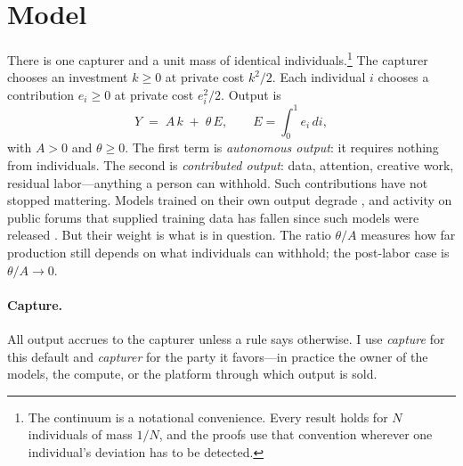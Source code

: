 \section{Model}

There is one capturer and a unit mass of identical individuals.\footnote{The continuum is
a notational convenience. Every result holds for $N$ individuals of mass $1/N$, and the
proofs use that convention wherever one individual's deviation has to be detected.} The
capturer chooses an investment $k\ge 0$ at private cost $k^2/2$. Each individual $i$ chooses
a contribution $e_i\ge 0$ at private cost $e_i^2/2$. Output is
\begin{equation}
  Y \;=\; A\,k \;+\; \theta\,E, \qquad E=\int_0^1 e_i\,di ,
\end{equation}
with $A>0$ and $\theta\ge 0$. The first term is \emph{autonomous output}: it requires
nothing from individuals. The second is \emph{contributed output}: data, attention,
creative work, residual labor---anything a person can withhold. Such contributions have
not stopped mattering. Models trained on their own output degrade \citep{Shumailov2024},
and activity on public forums that supplied training data has fallen since such models
were released \citep{delRioChanona2024}. But their weight is what is in question. The ratio $\theta/A$
measures how far production still depends on what individuals can withhold; the
post-labor case is $\theta/A\to 0$.

\paragraph{Capture.} All output accrues to the capturer unless a rule says otherwise. I
use \emph{capture} for this default and \emph{capturer} for the party it favors---in
practice the owner of the models, the compute, or the platform through which output is
sold.

